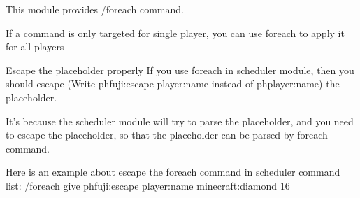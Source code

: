 
This module provides /foreach command.

If a command is only targeted for single player, you can use foreach to apply it for all players


\begin{example}{}
\end{example}

\begin{tips}{Escape the placeholder properly}
    If you use foreach in scheduler module, then you should escape (Write ph{fuji:escape player:name} instead of ph{player:name}) the placeholder.

    It's because the scheduler module will try to parse the placeholder, and you need to escape the placeholder, so that the placeholder can be parsed by foreach command.

    Here is an example about escape the foreach command in scheduler command list: /foreach give ph{fuji:escape player:name} minecraft:diamond 16
\end{tips}
